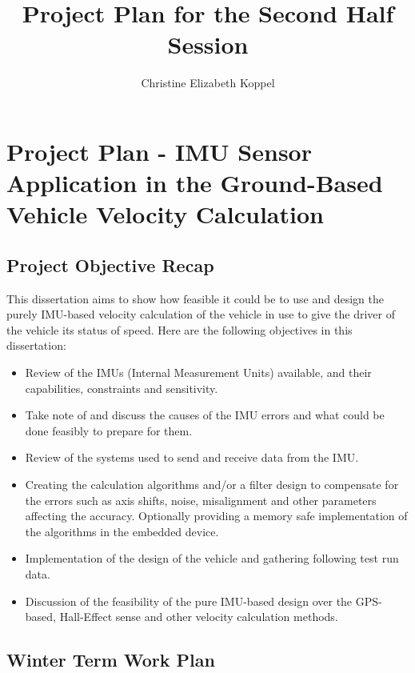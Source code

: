 \documentclass[
  10pt,
]{article}
\title{Project Plan for the Second Half Session}
\author{Christine Elizabeth Koppel}
\date{}
\providecommand{\tightlist}{%
  \setlength{\itemsep}{0pt}\setlength{\parskip}{0pt}}
\begin{document}
\maketitle

\hypertarget{project-plan---imu-sensor-application-in-the-ground-based-vehicle-velocity-calculation}{%
\section{Project Plan - IMU Sensor Application in the Ground-Based
Vehicle Velocity
Calculation}\label{project-plan---imu-sensor-application-in-the-ground-based-vehicle-velocity-calculation}}

\hypertarget{project-objective-recap}{%
\subsection{Project Objective Recap}\label{project-objective-recap}}

This dissertation aims to show how feasible it could be to use and
design the purely IMU-based velocity calculation of the vehicle in use
to give the driver of the vehicle its status of speed. Here are the
following objectives in this dissertation:

\begin{itemize}
\tightlist
\item
  Review of the IMUs (Internal Measurement Units) available, and their
  capabilities, constraints and sensitivity.
\item
  Take note of and discuss the causes of the IMU errors and what could
  be done feasibly to prepare for them.
\item
  Review of the systems used to send and receive data from the IMU.
\item
  Creating the calculation algorithms and/or a filter design to
  compensate for the errors such as axis shifts, noise, misalignment and
  other parameters affecting the accuracy. Optionally providing a memory
  safe implementation of the algorithms in the embedded device.
\item
  Implementation of the design of the vehicle and gathering following
  test run data.
\item
  Discussion of the feasibility of the pure IMU-based design over the
  GPS-based, Hall-Effect sense and other velocity calculation methods.
\end{itemize}

\hypertarget{winter-term-work-plan}{%
\subsection{Winter Term Work Plan}\label{winter-term-work-plan}}
\end{document}

